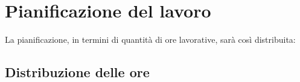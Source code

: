 \documentclass[a4paper, 12pt]{article}
\begin{document}
\newpage
\section{Pianificazione del lavoro}

La pianificazione, in termini di quantità di ore lavorative, sarà così distribuita:

\subsection{Distribuzione delle ore}

\end{document}

